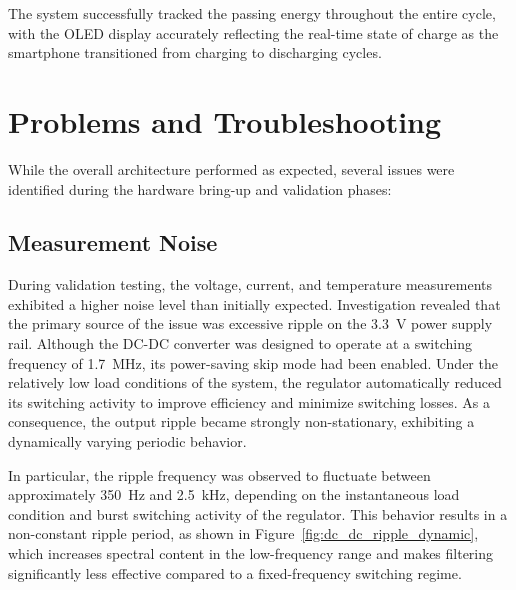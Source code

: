 The system successfully tracked the passing energy throughout the entire cycle, with the OLED display accurately reflecting the real-time state of charge as the smartphone transitioned from charging to discharging cycles.


\section{Problems and Troubleshooting}\label{problems}

While the overall architecture performed as expected, several issues were identified during the hardware bring-up and validation phases:

\subsection{Measurement Noise}

During validation testing, the voltage, current, and temperature measurements exhibited a higher noise level than initially expected. Investigation revealed that the primary source of the issue was excessive ripple on the \SI{3.3}{\volt} power supply rail. Although the DC-DC converter was designed to operate at a switching frequency of \SI{1.7}{\mega\hertz}, its power-saving skip mode had been enabled. Under the relatively low load conditions of the system, the regulator automatically reduced its switching activity to improve efficiency and minimize switching losses. As a consequence, the output ripple became strongly non-stationary, exhibiting a dynamically varying periodic behavior.

In particular, the ripple frequency was observed to fluctuate between approximately \SI{350}{\hertz} and \SI{2.5}{\kilo\hertz}, depending on the instantaneous load condition and burst switching activity of the regulator. This behavior results in a non-constant ripple period, as shown in Figure~\ref{fig:dc_dc_ripple_dynamic}, which increases spectral content in the low-frequency range and makes filtering significantly less effective compared to a fixed-frequency switching regime.


